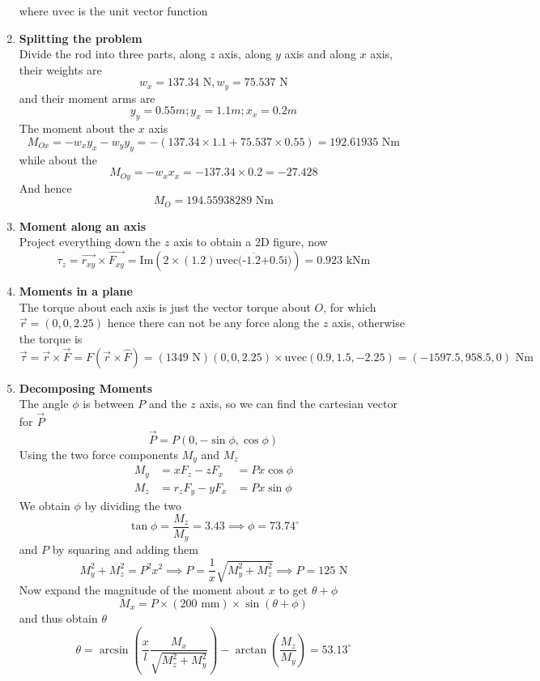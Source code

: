 \documentclass[12pt]{article}
\begin{document}
\begin{enumerate}
$$$$
where $\text{uvec}$ is the unit vector function
\item \textbf{Splitting the problem} \\
Divide the rod into three parts, along $z$ axis, along $y$ axis and along $x$ axis, their weights are
$$
w_{x} = 137.34 \text{ N}, w_{y } = 75.537 \text{ N}
$$
and their moment arms are
$$
y_{y} = 0.55 m; y_{x} = 1.1 m; x_{x} = 0.2 m
$$
The moment about the $x$ axis
$$
M_{Ox} = -w_{x}y_{x} -w_{y}y_{y} = -(137.34 \times 1.1 + 75.537 \times 0.55) = 192.61935 \text{ Nm}
$$
while about the 
$$
M_{Oy} = - w_{x}x_{x} = -137.34 \times 0.2 = -27.428
$$
And hence
$$
M_{O} = 194.55938289 \text{ Nm}
$$
\item \textbf{Moment along an axis} \\
Project everything down the $z$ axis to obtain a 2D figure, now
$$
\tau_{z} = \vec{r_{xy}} \times \vec{F_{xy}} = \mathrm{Im}(2\times(1.2 )\overline{\text{uvec(-1.2+0.5i)}}) = 0.923 \text{ kNm}
$$

\item \textbf{Moments in a plane} \\
The torque about each axis is just the vector torque about $O$, for which $\vec{r} = (0,0,2.25)$ hence there can not be any force along the $z$ axis, otherwise the torque is
$$
\vec{\tau} = \vec{r} \times \vec{F} = F( \vec{r} \times \hat{F}) = (1349 \text{ N}) (0,0,2.25)\times \text{uvec}(0.9, 1.5, -2.25) = (-1597.5, 958.5, 0) \text{ Nm}
$$

\item \textbf{Decomposing Moments} \\
The angle $\phi$ is between $P$ and the $z$ axis, so we can find the cartesian vector for $\vec{P}$
$$
\vec{P} = P(0,-\sin \phi, \cos \phi)
$$
Using the two force components $M_{y}$ and $M_{z}$ 
$$
\begin{aligned}
M_{y} &= xF_{z} - zF_{x} &= Px \cos \phi \\
M_{z} &= r_{z}F_{y}-yF_{x} &= P x\sin \phi
\end{aligned}
$$
We obtain $\phi$ by dividing the two
$$
 \tan \phi = \frac{M_{z}}{M_{y}} = 3.43 \implies \phi = 73.74^{\circ}
$$
and $P$ by squaring and adding them
$$
M_{y}^{2} + M_{z}^{2} = P^{2}x^{2} \implies P = \frac{1}{x}\sqrt{ M_{y}^{2} + M_{z}^{2} } \implies P = 125 \text{ N}
$$
Now expand the magnitude of the moment about $x$ to get $\theta + \phi$
$$
M_{x} = P \times(200 \text{ mm})  \times \sin (\theta + \phi)
$$
and thus obtain $\theta$
$$
\theta = \arcsin \left(\frac{x}{l} \frac{M_{x}}{ \sqrt{ M_{z}^{2}  + M_{y}^{2}} }\right) - \arctan \left( \frac{M_{z}}{M_{y}} \right) = 53.13^{\circ}
$$



\end{enumerate}
\end{document}
